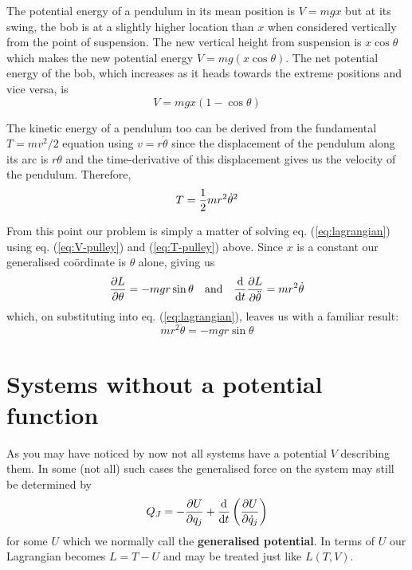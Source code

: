\documentclass[english,seminar,headertitle]{lecture}
\begin{document}
The potential energy of a pendulum in its mean position is $V = mgx$ but at its swing, the bob is at a slightly higher location than $x$ when considered vertically from the point of suspension. The new vertical height from suspension is $x \cos \theta$ which makes the new potential energy $V = mg(x\cos\theta)$. The net potential energy of the bob, which increases as it heads towards the extreme positions and vice versa, is
\begin{equation}
	V = mgx (1 - \cos\theta)
	\label{eq:V-pulley}
\end{equation}%

The kinetic energy of a pendulum too can be derived from the fundamental $T = mv^2/2$ equation using $v = r\dot{\theta}$ since the displacement of the pendulum along its arc is $r\theta$ and the time-derivative of this displacement gives us the velocity of the pendulum. Therefore,
\begin{equation}
	T = {1\over2}mr^2\dot{\theta}^2
	\label{eq:T-pulley}
\end{equation}%

From this point our problem is simply a matter of solving eq. (\ref{eq:lagrangian}) using eq. (\ref{eq:V-pulley}) and (\ref{eq:T-pulley}) above. Since $x$ is a constant our generalised co\"{o}rdinate is $\theta$ alone, giving us
$$
{\partial L \over \partial \theta} = -mgr \sin\theta \quad \textrm{and} \quad {\textrm{d} \over \textrm{d} t }{\partial L \over \partial \ddot{\theta}} = mr^2\dot{\theta}
$$
which, on substituting into eq. (\ref{eq:lagrangian}), leaves us with a familiar result:
\begin{equation}
	mr^2\ddot{\theta} = -mgr\sin\theta
	\label{eq:pendulum-result}
\end{equation}%

\section{Systems without a potential function}

As you may have noticed by now not all systems have a potential $V$ describing them. In some (not all) such cases the generalised force on the system may still be determined by
\begin{equation}
	Q_J = - {\partial U \over \partial q_j} + {\textrm{d} \over \textrm{d} t} \left( {\partial U \over \partial \dot{q}_j} \right)
	\label{eq:Q_J}
\end{equation}%
for some $U$ which we normally call the \textbf{generalised potential}. In terms of $U$ our Lagrangian becomes $L=T-U$ and may be treated just like $L(T,V)$.
\end{document}
